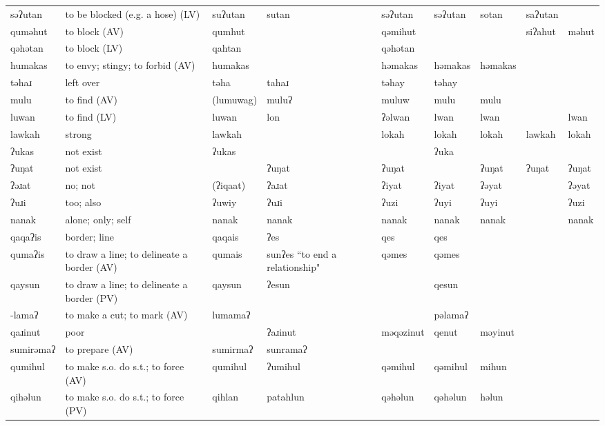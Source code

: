 \begin{landscape}
\begin{longtable}{*{9}{>{\raggedright\arraybackslash}p{}}}
\text{*}səʔutan & to be blocked (e.g. a hose) (LV) & suʔutan & sutan & səʔutan & səʔutan & sotan & saʔutan & \\
\text{*}quməhut & to block (AV) & qumhut &  & qəmihut &  &  & siʔahut & məhut\\
\text{*}qəhətan & to block (LV) & qahtan &  & qəhətan &  &  &  & \\
\text{*}humakas & to envy; stingy; to forbid (AV) & humakas &  & həmakas & həmakas & həmakas &  & \\
\text{*}təhaɹ & left over & təha & tahaɹ & təhay & təhay &  &  & \\
\text{*}mulu & to find (AV) & (lumuwag) & muluʔ & muluw & mulu & mulu &  & \\
\text{*}luwan & to find (LV) & luwan & lon & ʔəlwan & lwan & lwan &  & lwan\\
\text{*}lawkah & strong & lawkah &  & lokah & lokah & lokah & lawkah & lokah\\
\text{*}ʔukas & not exist & ʔukas &  &  & ʔuka &  &  & \\
\text{*}ʔuŋat & not exist &  & ʔuŋat & ʔuŋat &  & ʔuŋat & ʔuŋat & ʔuŋat\\
\text{*}ʔəɹat & no; not & (ʔiqaat) & ʔaɹat & ʔiyat & ʔiyat & ʔəyat &  & ʔəyat\\
\text{*}ʔuɹi & too; also & ʔuwiy & ʔuɹi & ʔuzi & ʔuyi & ʔuyi &  & ʔuzi\\
\text{*}nanak & alone; only; self & nanak & nanak & nanak & nanak & nanak &  & nanak\\
\text{*}qaqaʔis & border; line & qaqais & ʔes & qes & qes &  &  & \\
\text{*}qumaʔis & to draw a line; to delineate a border (AV) & qumais & sunʔes \newline ``to end a relationship" & qəmes & qəmes &  &  & \\
\text{*}qaysun & to draw a line; to delineate a border (PV) & qaysun & ʔesun &  & qesun &  &  & \\
\text{*}-lamaʔ & to make a cut; to mark (AV) & lumamaʔ &  &  & pəlamaʔ &  &  & \\
\text{*}qaɹinut & poor &  & ʔaɹinut & məqəzinut & qenut & məyinut &  & \\
\text{*}sumirəmaʔ & to prepare (AV) & sumirmaʔ & sunramaʔ &  &  &  &  & \\
\text{*}qumihul & to make s.o. do s.t.; to force (AV) & qumihul & ʔumihul & qəmihul & qəmihul & mihun &  & \\
\text{*}qihəlun & to make s.o. do s.t.; to force (PV) & qihlan & patahlun & qəhəlun & qəhəlun & həlun &  & \\

\end{longtable}
\end{landscape}
